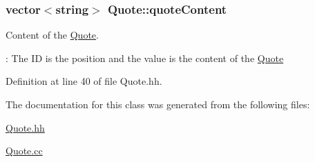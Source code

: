 \subsubsection[{\texorpdfstring{quote\+Content}{quoteContent}}]{\setlength{\rightskip}{0pt plus 5cm}vector$<$string$>$ Quote\+::quote\+Content\hspace{0.3cm}{\ttfamily [private]}}\hypertarget{class_quote_a0ffcb584920e14d7dd5c45820997f989}{}\label{class_quote_a0ffcb584920e14d7dd5c45820997f989}


Content of the \hyperlink{class_quote}{Quote}. 

\+: The ID is the position and the value is the content of the \hyperlink{class_quote}{Quote} 

Definition at line 40 of file Quote.\+hh.



The documentation for this class was generated from the following files\+:\begin{DoxyCompactItemize}
\item 
\hyperlink{_quote_8hh}{Quote.\+hh}\item 
\hyperlink{_quote_8cc}{Quote.\+cc}\end{DoxyCompactItemize}
